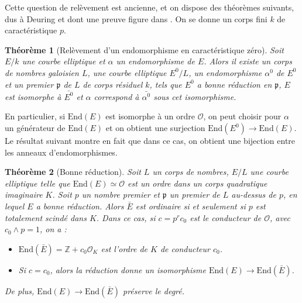 \documentclass[11pt,a4paper]{article}
\newcommand{\Z}{\mathbb{Z}}
\renewcommand{\O}{\mathcal{O}}
\newcommand{\vers}{\longrightarrow}
\newcommand{\End}{\mathrm{End}}
\renewcommand{\frak}{\mathfrak}
\renewcommand{\v}{\vspace{5mm}}
\newtheorem*{thm}{Théorème}
\theoremstyle{definition}
\begin{document}
\v

Cette question de relèvement est ancienne, et on dispose des théorèmes suivants, dus à Deuring et dont une preuve figure dans \cite{Lang}. On se donne un corps fini $k$ de caractéristique $p$.


\begin{thm}[Relèvement d'un endomorphisme en caractéristique zéro]

Soit $E/k$ une courbe elliptique et $\alpha$ un endomorphisme de $E$. Alors il existe un corps de nombres galoisien $L$, une courbe elliptique $E^0/L$, un endomorphisme $\alpha^0$ de $E^0$ et un premier $\frak p$ de $L$ de corps résiduel $k$, tels que $E^0$ a bonne réduction en $\frak p$, $E$ est isomorphe à $\bar{E^0}$ et $\alpha$ correspond à $\bar{\alpha^0}$ sous cet isomorphisme.

\end{thm}

En particulier, si $\End(E)$ est isomorphe à un ordre $\O$, on peut choisir pour $\alpha$ un générateur de $\End(E)$ et on obtient une surjection $\End(E^0)\vers \End(E).$ Le résultat suivant montre en fait que dans ce cas, on obtient une bijection entre les anneaux d'endomorphismes.

\begin{thm}[Bonne réduction]

Soit $L$ un corps de nombres, $E/L$ une courbe elliptique telle que $\End(E)\simeq \O$ est un ordre dans un corps quadratique imaginaire $K$. Soit $p$ un nombre premier et $\frak p$ un premier de $L$ au-dessus de $p$, en lequel $E$ a bonne réduction. Alors $\bar{E}$ est ordinaire si et seulement si $p$ est totalement scindé dans $K$. Dans ce cas, si $c=p^r c_0$ est le conducteur de $\O$, avec $c_0 \wedge p = 1$, on a :

\begin{itemize}
\item[(i)] $\End(\bar{E})=\Z+c_0 \O_K$ est l'ordre de $K$ de conducteur $c_0$.
\item[(ii)] Si $c=c_0$, alors la réduction donne un isomorphisme $\End(E)\vers\End(\bar{E})$.
\end{itemize}
De plus, $\End(E)\vers\End(\bar{E})$ préserve le degré.

\end{thm}
\end{document}

